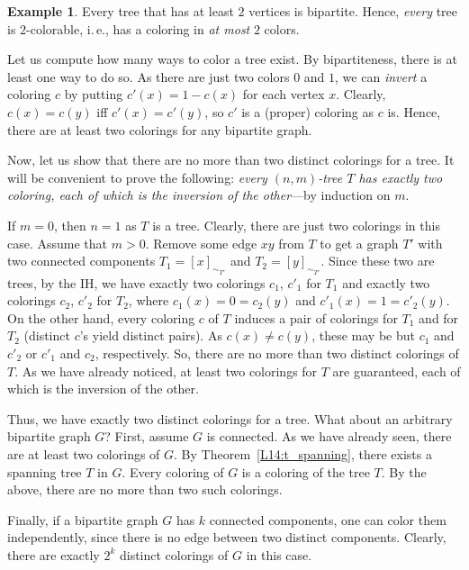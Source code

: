 \documentclass[12pt,notitlepage]{article}
\theoremstyle{plain}
\theoremstyle{definition}
\newtheorem{exm}[thm]{Example}
\theoremstyle{plain}
\newcommand{\1}{\mathbf{1}}
\newcommand{\0}{\mathbf{0}}
\begin{document}
\begin{exm}
Every tree that has at least $2$ vertices is bipartite. Hence, \emph{every} tree is $2$-colorable, i.\,e., has a coloring in \emph{at most} $2$ colors.

Let us compute how many ways to color a tree exist. By bipartiteness, there is at least one way to do so. As there are just two colors $0$ and $1$, we can \emph{invert} a coloring $c$ by putting $c'(x) = 1 - c(x)$ for each vertex $x$. Clearly, $c(x) = c(y)$ iff $c'(x) = c'(y)$, so $c'$ is a (proper) coloring as $c$ is. Hence, there are at least two colorings for any bipartite graph.

Now, let us show that there are no more than two distinct colorings for a tree. It will be convenient to prove the following: \emph{every $(n,m)$-tree $T$ has exactly two coloring, each of which is the inversion of the other}---by induction on $m$.

If $m = 0$, then $n = 1$ as $T$ is a tree. Clearly, there are just two colorings in this case. Assume that $m > 0$. Remove some edge $x y$ from $T$ to get a graph $T'$ with two connected components $T_1 = [x]_{\sim_{T'}}$ and $T_2 = [y]_{\sim_{T'}}$. Since these two are trees, by the IH, we have exactly two colorings $c_1$, $c'_1$ for $T_1$ and exactly two colorings $c_2$, $c'_2$ for $T_2$, where $c_1(x) = 0 = c_2(y)$ and $c'_1(x) = 1 = c'_2(y)$. On the other hand, every coloring $c$ of $T$ induces a pair of colorings for $T_1$ and for $T_2$ (distinct $c$'s yield distinct pairs). As $c(x) \neq c(y)$, these may be but $c_1$ and $c'_2$ or $c'_1$ and $c_2$, respectively. So, there are no more than two distinct colorings of $T$. As we have already noticed, at least two colorings for $T$ are guaranteed, each of which is the inversion of the other.

Thus, we have exactly two distinct colorings for a tree. What about an arbitrary bipartite graph $G$? First, assume $G$ is connected. As we have already seen, there are at least two colorings of $G$. By Theorem~\ref{L14:t_spanning}, there exists a spanning tree $T$ in $G$. Every coloring of $G$ is a coloring of the tree $T$. By the above, there are no more than two such colorings.

Finally, if a bipartite graph $G$ has $k$ connected components, one can color them independently, since there is no edge between two distinct components. Clearly, there are exactly $2^k$ distinct colorings of $G$ in this case.
\end{exm}
\end{document}
